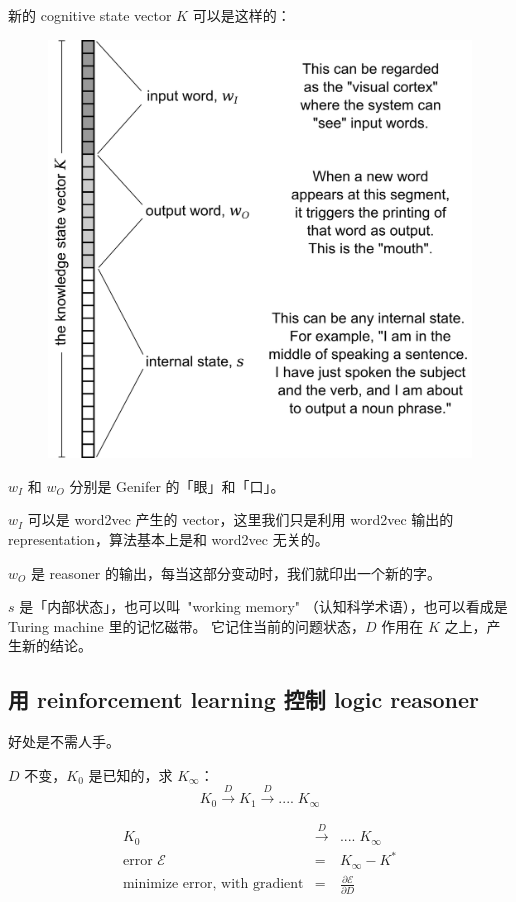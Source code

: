 \documentclass[12pt]{article}
\begin{document}
新的 cognitive state vector $K$ 可以是这样的：
\begin{figure}[H]
\centering
\includegraphics[scale=0.75]{internal-state-K.png}
\end{figure}

$w_I$ 和 $w_O$ 分别是 Genifer 的「眼」和「口」。

$w_I$ 可以是 word2vec 产生的 vector，这里我们只是利用 word2vec 输出的 representation，算法基本上是和 word2vec 无关的。

$w_O$ 是 reasoner 的输出，每当这部分变动时，我们就印出一个新的字。 

$s$ 是「内部状态」，也可以叫 \,"working memory" （认知科学术语），也可以看成是 Turing machine 里的记忆磁带。 它记住当前的问题状态，$D$ 作用在 $K$ 之上，产生新的结论。

\subsection{用 reinforcement learning 控制 logic reasoner}

好处是不需人手。 



$D$ 不变，$K_0$ 是已知的，求 $K_\infty$：
$$ K_0 \stackrel{D}{\longrightarrow} K_1 \stackrel{D}{\longrightarrow} .... \; K_\infty $$

\begin{eqnarray}
K_0 & \stackrel{D}{\longrightarrow} & .... \; K_\infty \nonumber \\
\mbox{error } \mathcal{E} & = & K_\infty - K^* \nonumber \\
\mbox{minimize error, with gradient} & = & \frac{\partial \mathcal{E}}{\partial D} \nonumber
\end{eqnarray}
\end{document}

